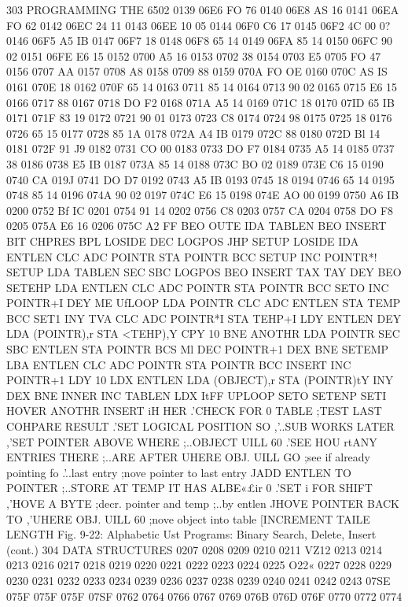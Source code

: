 {{{{{{{{{{303
PROGRAMMING THE 6502
0139 06E6 FO 76
0140 06E8 AS 16
0141 06EA FO 62
0142 06EC 24 11
0143 06EE 10 05
0144 06F0 C6 17
0145 06F2 4C 00 0?
0146 06F5 A5 IB
0147 06F7 18
0148 06F8 65 14
0149 06FA 85 14
0150 06FC 90 02
0151 06FE E6 15
0152 0700 A5 16
0153 0702 38
0154 0703 E5  0705 FO 47
0156 0707 AA
0157 0708 A8
0158 0709 88
0159 070A FO OE
0160 070C AS IS
0161 070E 18
0162 070F 65 14
0163 0711 85 14
0164 0713 90 02
0165 0715 E6 15
0166 0717 88
0167 0718 DO F2
0168 071A A5 14
0169 071C 18
0170 07ID 65 IB
0171 071F 83 19
0172 0721 90 01
0173 0723 C8
0174 0724 98
0175 0725 18
0176 0726 65 15
0177 0728 85 1A
0178 072A A4 IB
0179 072C 88
0180 072D Bl 14
0181 072F 91 J9
0182 0731 CO 00
0183 0733 DO F7
0184 0735 A5 14
0185 0737 38
0186 0738 E5 IB
0187 073A 85 14
0188 073C BO 02
0189 073E C6 15
0190 0740 CA
019J 0741 DO D7
0192 0743 A5 IB
0193 0745 18
0194 0746 65 14
0195 0748 85 14
0196 074A 90 02
0197 074C E6 15
0198 074E AO 00
0199 0750 A6 IB
0200 0752 Bf IC
0201 0754 91 14
0202 0756 C8
0203 0757 CA
0204 0758 DO F8
0205 075A E6 16
0206 075C A2 FF
BEO OUTE
IDA TABLEN
BEO INSERT
BIT CHPRES
BPL LOSIDE
DEC LOGPOS
JHP SETUP
LOSIDE IDA ENTLEN
CLC
ADC POINTR
STA POINTR
BCC SETUP
INC POINTR*!
SETUP LDA TABLEN
SEC
SBC LOGPOS
BEO INSERT
TAX
TAY
DEY
BEO SETEHP
LDA ENTLEN
CLC
ADC POINTR
STA POINTR
BCC SETO
INC POINTR+I
DEY
ME UfLOOP
LDA POINTR
CLC
ADC ENTLEN
STA TEMP
BCC SET1
INY
TVA
CLC
ADC POINTR*I
STA TEHP+I
LDY ENTLEN
DEY
LDA (POINTR),r
STA <TEHP),Y
CPY 10
BNE ANOTHR
LDA POINTR
SEC
SBC ENTLEN
STA POINTR
BCS Ml
DEC POINTR+1
DEX
BNE SETEMP
LBA ENTLEN
CLC
ADC POINTR
STA POINTR
BCC INSERT
INC POINTR+1
LDY 10
LDX ENTLEN
LDA (OBJECT),r
STA (POINTR)tY
INY
DEX
BNE INNER
INC TABLEN
LDX ItFF
UPLOOP
SETO
SETENP
SETI
HOVER
ANOTHR
INSERT
iH HER
.'CHECK FOR 0 TABLE
;TEST LAST COHPARE RESULT
.'SET LOGICAL POSITION SO
,'..SUB WORKS LATER
,'SET POINTER ABOVE WHERE
;..OBJECT UILL 60
.'SEE HOU rtANY ENTRIES THERE
;..ARE AFTER UHERE OBJ. UILL GO
;see if already pointing fo
.'..last entry
;nove pointer to last entry
JADD ENTLEN TO POINTER
;..STORE AT TEMP
IT HAS ALBE«£ir 0
.'SET i FOR SHIFT
,'HOVE A BYTE
;decr. pointer and temp
;..by entlen
JHOVE POINTER BACK TO
,'UHERE OBJ. UILL 60
;nove object into table
[INCREMENT TAILE LENGTH
Fig. 9-22: Alphabetic Ust Programs: Binary Search, Delete, Insert (cont.)
304
DATA STRUCTURES
0207
0208
0209
0210
0211
VZ12
0213
0214
0213
0216
0217
0218
0219
0220
0221
0222
0223
0224
0225
O22«
0227
0228
0229
0230
0231
0232
0233
0234
0239
0236
0237
0238
0239
0240
0241
0242
0243
07SE
075F
075F
075F
07SF
0762
0764
0766
0767
0769
076B
076D
076F
0770
0772
0774
}}}}}}}}}}
